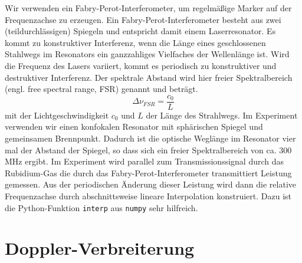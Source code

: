 Wir verwenden ein Fabry-Perot-Interferometer, um regelmäßige Marker auf der Frequenzachse zu erzeugen. Ein Fabry-Perot-Interferometer besteht aus zwei (teildurchlässigen) Spiegeln und entspricht damit einem Laserresonator. Es kommt zu konstruktiver Interferenz, wenn die Länge eines geschlossenen Stahlwegs im Resonators ein ganzzahliges Vielfaches der  Wellenlänge ist. Wird die Frequenz des Lasers variiert, kommt es periodisch zu konstruktiver und destruktiver Interferenz. Der spektrale Abstand wird hier freier Spektralbereich (engl. free spectral range, FSR) genannt und beträgt.
	\begin{equation}
	\Delta\nu_{FSR}=\frac{c_0}{L}  
	\end{equation}
mit der Lichtgeschwindigkeit $c_0$ und $L$ der Länge des Strahlwegs. Im Experiment verwenden wir einen konfokalen Resonator mit sphärischen Spiegel und gemeinsamen Brennpunkt. Dadurch ist die optische Weglänge im Resonator vier mal der Abstand der Spiegel,  so dass sich ein freier Spektralbereich von ca. 300 MHz ergibt. Im Experiment wird parallel zum Transmissionssignal durch das Rubidium-Gas die durch das Fabry-Perot-Interferometer transmittiert Leistung gemessen. Aus der periodischen Änderung dieser Leistung wird dann die relative Frequenzachse durch abschnittsweise lineare Interpolation konstruiert. Dazu ist die Python-Funktion \texttt{interp} aus \texttt{numpy} sehr hilfreich.





\section{Doppler-Verbreiterung}

